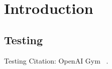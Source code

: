 
\chapter{Introduction}\label{chapter:introduction}

\section{Testing}

Testing Citation: OpenAI Gym ~\parencite{1802.09464}.